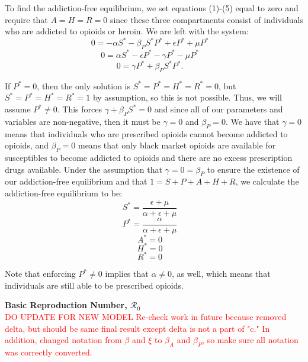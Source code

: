 \documentclass[12pt]{article}
\begin{document}
To find the addiction-free equilibrium, we set equations (1)-(5) equal to zero and require that $A=H=R=0$ since these three compartments consist of individuals who are addicted to opioids or heroin. We are left with the system: \\
\[0=-\alpha S^* -\beta_{P} S^* P^* + \epsilon P^* +\mu P^* \quad\]
\[0=\alpha S^* - \epsilon P^* -\gamma P^* - \mu P^* \quad\]
\[0=\gamma P^* + \beta_{P} S^* P^*.   \quad\]



If $P^*=0$, then the only solution is $S^*=P^*=H^*=R^*=0$, but $S^*=P^*=H^*=R^*=1$ by assumption, so this is not possible. Thus, we will assume $P^* \neq 0. $ This forces $\gamma + \beta_{P} S^* =0$ and since all of our parameters and variables are non-negative, then it must be $\gamma=0$ and $\beta_{P}=0$. We have that $\gamma=0$ means that individuals who are prescribed opioids cannot become addicted to opioids, and $\beta_{P}=0$ means that only black market opioids are available for susceptibles to become addicted to opioids and there are no excess prescription drugs available. Under the assumption that $\gamma=0=\beta_{P}$ to ensure the existence of our addiction-free equilibrium and that $1=S+P+A+H+R$, we calculate the addiction-free equilibrium to be: \\

\[S^*=\frac{\epsilon + \mu}{\alpha + \epsilon +\mu}\quad\]
\[P^*=\frac{\alpha}{\alpha + \epsilon +\mu}\quad\]
\[A^*=0\quad\]
\[H^*=0\quad\]
\[R^*=0\quad\] 

Note that enforcing $P^* \neq 0$ implies that $\alpha \neq 0$, as well, which means that individuals are still able to be prescribed opioids. 





\textbf{Basic Reproduction Number, \textbf{$\mathscr{R}_0$}} \\
\textcolor{red}{DO UPDATE FOR NEW MODEL Re-check work in future because removed delta, but should be same final result except 
delta is not a part of "c." In addition, changed notation from $\beta$ and $\xi$ to $\beta_{A}$ and $\beta_{P}$, so make sure all notation was correctly converted.} \\
\end{document}
